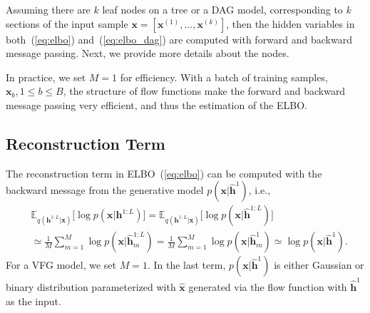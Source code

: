 \documentclass[twoside]{article}
\begin{document}
 
Assuming there are $k$ leaf nodes on a tree or a DAG model, corresponding to $k$ sections of the input sample $\mathbf{x} = [\mathbf{x}^{(1)}, ..., \mathbf{x}^{(k)}]$, then the hidden variables in both~(\ref{eq:elbo}) and~(\ref{eq:elbo_dag}) are computed with forward and backward message passing. 
Next, we provide more details about the nodes.

In practice, we set $M=1$ for efficiency. With a batch of training samples, $\mathbf{x}_b, 1 \leqslant b \leqslant B$, the structure of flow functions make the  forward  and  backward message passing very efficient, and  thus the estimation of the ELBO.  


\subsection{Reconstruction Term}

The reconstruction term in ELBO~(\ref{eq:elbo}) can be computed with the backward message from the generative model $p(\mathbf{x}| \widehat{\mathbf{h}}^{1})$, i.e.,
\begin{align*} 
&\mathbb{E}_{q(\mathbf{h}^{1:L}|\mathbf{x})}\big[ \log p(\mathbf{x}|\mathbf{h}^{1:L})\big]
=\mathbb{E}_{q(\mathbf{h}^{1:L}|\mathbf{x})}\big[ \log p(\mathbf{x}|\widehat{\mathbf{h}}^{1:L})  \big] \\
&\simeq \frac{1}{M}\sum_{m=1}^M \log p(\mathbf{x}| \widehat{\mathbf{h}}^{1:L}_m) = \frac{1}{M}\sum_{m=1}^M \log p(\mathbf{x}| \widehat{\mathbf{h}}^{1}_m) \simeq  \log p(\mathbf{x}| \widehat{\mathbf{h}}^{1}) .
 \end{align*}
For a VFG model, we set $M=1$. In the last term,  $p(\mathbf{x}| \widehat{\mathbf{h}}^{1})$ is either Gaussian or binary distribution parameterized with $\widehat{\mathbf{x}}$ generated via the flow function with $\widehat{\mathbf{h}}^{1}$ as the input. 
\end{document}
